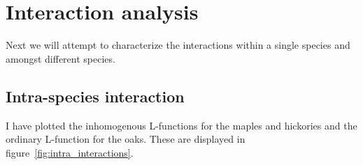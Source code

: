 \documentclass[12pt,a4paper,oneside,article]{memoir}
\begin{document}
\section{Interaction analysis}

Next we will attempt to characterize the interactions within a single species
and amongst different species.

\subsection{Intra-species interaction}

I have plotted the inhomogenous L-functions \cite{illian}\cite{gelfand} for the maples
and hickories and the ordinary L-function for the oaks.
These are displayed in figure~\ref{fig:intra_interactions}.
\end{document}
